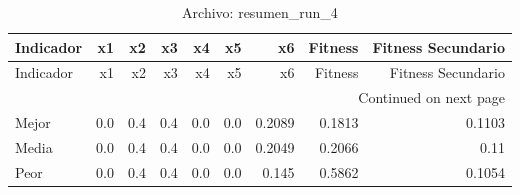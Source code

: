 \begin{longtable}{lrrrrrrrr}
\caption{Archivo: resumen\_run\_4}\label{tab:resumen_run_4} \\
\toprule
Indicador & x1 & x2 & x3 & x4 & x5 & x6 & Fitness & Fitness Secundario \\
\midrule
\endfirsthead
\toprule
Indicador & x1 & x2 & x3 & x4 & x5 & x6 & Fitness & Fitness Secundario \\
\midrule
\endhead
\midrule
\multicolumn{9}{r}{Continued on next page} \\
\midrule
\endfoot
\bottomrule
\endlastfoot
Mejor & 0.0 & 0.4 & 0.4 & 0.0 & 0.0 & 0.2089 & 0.1813 & 0.1103 \\
Media & 0.0 & 0.4 & 0.4 & 0.0 & 0.0 & 0.2049 & 0.2066 & 0.11 \\
Peor & 0.0 & 0.4 & 0.4 & 0.0 & 0.0 & 0.145 & 0.5862 & 0.1054 \\
\end{longtable}